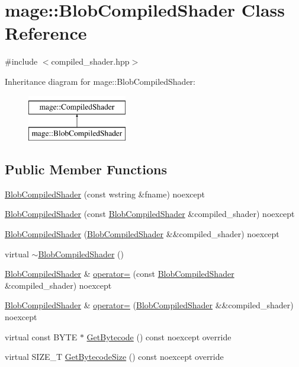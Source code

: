 \hypertarget{classmage_1_1_blob_compiled_shader}{}\section{mage\+:\+:Blob\+Compiled\+Shader Class Reference}
\label{classmage_1_1_blob_compiled_shader}


{\ttfamily \#include $<$compiled\+\_\+shader.\+hpp$>$}

Inheritance diagram for mage\+:\+:Blob\+Compiled\+Shader\+:\begin{figure}[H]
\begin{center}
\leavevmode
\includegraphics[height=2.000000cm]{classmage_1_1_blob_compiled_shader}
\end{center}
\end{figure}
\subsection*{Public Member Functions}
\begin{DoxyCompactItemize}
\item 
\hyperlink{classmage_1_1_blob_compiled_shader_adc5b712c668912296a634bffb3a31e68}{Blob\+Compiled\+Shader} (const wstring \&fname) noexcept
\item 
\hyperlink{classmage_1_1_blob_compiled_shader_adc98af382bdedb7f407494187b900c1f}{Blob\+Compiled\+Shader} (const \hyperlink{classmage_1_1_blob_compiled_shader}{Blob\+Compiled\+Shader} \&compiled\+\_\+shader) noexcept
\item 
\hyperlink{classmage_1_1_blob_compiled_shader_afa486af89d0df11bafe200496e8d0b93}{Blob\+Compiled\+Shader} (\hyperlink{classmage_1_1_blob_compiled_shader}{Blob\+Compiled\+Shader} \&\&compiled\+\_\+shader) noexcept
\item 
virtual \hyperlink{classmage_1_1_blob_compiled_shader_a75f98c42b9a17980146b7308080394a5}{$\sim$\+Blob\+Compiled\+Shader} ()
\item 
\hyperlink{classmage_1_1_blob_compiled_shader}{Blob\+Compiled\+Shader} \& \hyperlink{classmage_1_1_blob_compiled_shader_ae32c9ce0827db31d31551e24c542f060}{operator=} (const \hyperlink{classmage_1_1_blob_compiled_shader}{Blob\+Compiled\+Shader} \&compiled\+\_\+shader) noexcept
\item 
\hyperlink{classmage_1_1_blob_compiled_shader}{Blob\+Compiled\+Shader} \& \hyperlink{classmage_1_1_blob_compiled_shader_ae8975eacd1f8303215cc91ab4d74faa1}{operator=} (\hyperlink{classmage_1_1_blob_compiled_shader}{Blob\+Compiled\+Shader} \&\&compiled\+\_\+shader) noexcept
\item 
virtual const B\+Y\+TE $\ast$ \hyperlink{classmage_1_1_blob_compiled_shader_a44cc21b9ab038c57155e64e8ced4d504}{Get\+Bytecode} () const noexcept override
\item 
virtual S\+I\+Z\+E\+\_\+T \hyperlink{classmage_1_1_blob_compiled_shader_a685f2a4aac87aa785c22940075eb23ec}{Get\+Bytecode\+Size} () const noexcept override
\end{DoxyCompactItemize}
